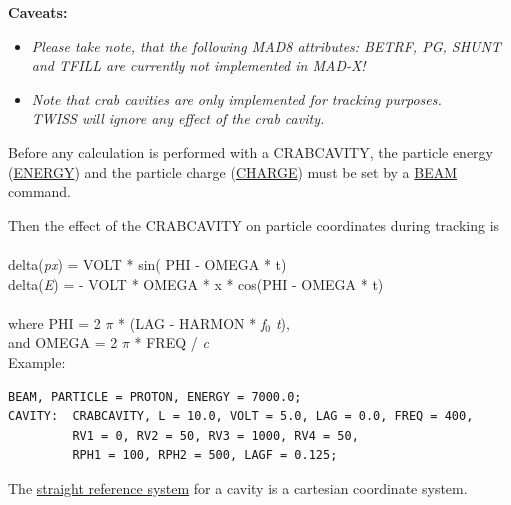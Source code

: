 {\bf Caveats:}
\begin{itemize}
   \item \textit{ Please take note, that the following MAD8 attributes:
     BETRF, PG, SHUNT and TFILL are currently not implemented in MAD-X!}
   \item \textit{ Note that crab cavities are only implemented for
     tracking  purposes. \\ TWISS will ignore any effect of the crab cavity.  
% 
}
\end{itemize} 


Before any calculation is performed with a CRABCAVITY, the particle
energy (\href{beam.html#energy}{ENERGY}) and the particle charge
(\href{beam.html#charge}{CHARGE}) must be set by a
\href{beam.html}{BEAM} command.   

Then the effect of the CRABCAVITY on particle coordinates during tracking is
\\
\\ delta(\textit{px})  = VOLT * sin( PHI - OMEGA * t) 
\\ delta(\textit{E})  = -  VOLT * OMEGA * x * cos(PHI - OMEGA * t) 
\\ 
\\ where PHI =  2 $\pi$ * (LAG - HARMON * \textit{f$_0$ t}), 
\\ and OMEGA = 2 $\pi$ * FREQ / \textit{c}
\\


Example: 
\begin{verbatim}
BEAM, PARTICLE = PROTON, ENERGY = 7000.0;
CAVITY:  CRABCAVITY, L = 10.0, VOLT = 5.0, LAG = 0.0, FREQ = 400,
         RV1 = 0, RV2 = 50, RV3 = 1000, RV4 = 50, 
         RPH1 = 100, RPH2 = 500, LAGF = 0.125;
\end{verbatim} 

The \href{local_system.html#straight}{straight reference system} for a
cavity is a cartesian coordinate system.  
 
